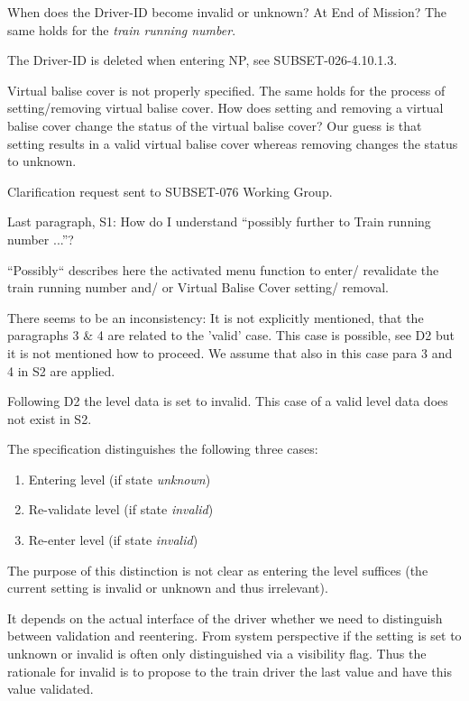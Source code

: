 \documentclass{template/openetcs_article}
\begin{document}
 When does the Driver-ID become invalid or unknown? At End of Mission? The same holds for the \emph{train running number}.

\resolution The Driver-ID is deleted when entering NP, see SUBSET-026-4.10.1.3.

Virtual balise cover is not properly specified. The same holds for the process of setting/removing virtual balise cover. How does setting and removing a virtual balise cover change the status of the virtual balise cover? Our guess is that setting results in a valid virtual balise cover whereas removing changes the status to unknown.

\resolution Clarification request sent to SUBSET-076 Working Group.

Last paragraph, S1: How do I understand ``possibly further to Train running number ...''?

\resolution ``Possibly`` describes here the activated menu function to enter/ revalidate the train running number and/ or Virtual Balise Cover setting/ removal.

There seems to be an inconsistency: It is not explicitly mentioned, that the paragraphs 3 \& 4 are related to the 'valid' case. This case is possible, see D2 but it is not mentioned how to proceed. We assume that also in this case para 3 and 4 in S2 are applied.

\resolution Following D2 the level data is set to invalid. This case of a valid level data does not exist in S2.


The specification distinguishes the following three cases:
\begin{enumerate}
   \item Entering level (if state \emph{unknown})
   \item Re-validate level (if state \emph{invalid})
   \item Re-enter level (if state \emph{invalid})
\end{enumerate}
The purpose of this distinction is not clear as entering the level suffices (the current setting is invalid or unknown and thus irrelevant).

\resolution It depends on the actual interface of the driver whether we need to distinguish between validation and reentering. From system perspective if the setting is set to unknown or invalid is often only distinguished via a visibility flag. Thus the rationale for invalid is to propose to the train driver the last value and have this value validated.
\end{document}
